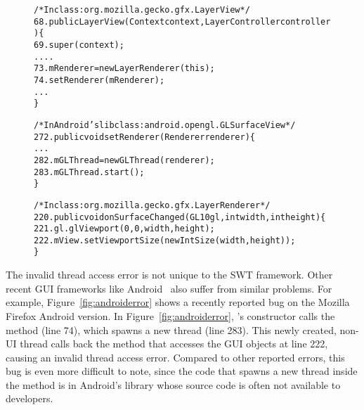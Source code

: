 \begin{figure}[t]
\begin{CodeOut}
\begin{alltt}

     /* In class: org.mozilla.gecko.gfx.LayerView */
68.  public LayerView(Context context, LayerController controller) \{
69.     super(context);
        ....
73.     mRenderer = new LayerRenderer(this);
74.     setRenderer(mRenderer);
        ...
     \}

     /* In Android's lib class: android.opengl.GLSurfaceView */
272. public void setRenderer(Renderer renderer) \{
        ...
282.    mGLThread = new GLThread(renderer);
283.    mGLThread.start();   
     \}

     /* In class: org.mozilla.gecko.gfx.LayerRenderer */
220. public void onSurfaceChanged(GL10 gl, int width, int height) \{
221.    gl.glViewport(0, 0, width, height);
222.    mView.setViewportSize(new IntSize(width, height));
     \}

\end{alltt}
\end{CodeOut}
\vspace*{-2.0ex}  %
\end{figure}

The invalid thread access error is not unique to the SWT framework. Other recent GUI frameworks
like Android~\cite{android} also suffer from similar problems. For example, 
Figure~\ref{fig:androiderror} shows a recently reported bug on the Mozilla Firefox Android version.
In Figure~\ref{fig:androiderror}, 's constructor calls the
 method (line 74), which spawns a new thread (line 283).
This newly created, non-UI thread calls back the  method that
accesses the GUI objects at line 222, causing an invalid thread access error.
Compared to other reported errors, this bug is even more difficult to note, 
since the code that spawns a new thread inside the  method is
in Android's library whose source code is often not available to developers.

